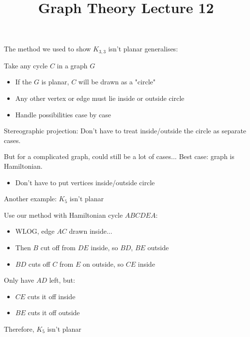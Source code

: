 \documentclass{beamer}
\title{Graph Theory Lecture 12}
\begin{document}
\begin{frame}{The method we used to show $K_{3,3}$ isn't planar generalises:}

\begin{block}{Take any cycle $C$ in a graph $G$}
\begin{itemize}
    \item If the $G$ is planar, $C$ will be drawn as a "circle"
    \item Any other vertex or edge must lie inside or outside circle
    \item Handle possibilities case by case
\end{itemize}
\end{block}

\begin{block}{Stereographic projection:}
Don't have to treat inside/outside the circle as separate cases.
\end{block}


\begin{block}{But for a complicated graph, could still be a lot of cases...}
  Best case: graph is Hamiltonian.
  \begin{itemize}
\item Don't have to put vertices inside/outside circle
  \end{itemize}
\end{block}

\end{frame}
\begin{frame}{Another example: $K_5$ isn't planar}
    \begin{block}{Use our method with Hamiltonian cycle $ABCDEA$:}
\begin{itemize}

    \item WLOG, edge $AC$ drawn inside...
    \item Then $B$ cut off from $DE$ inside, so $BD$, $BE$ outside
    \item $BD$ cuts off $C$ from $E$ on outside, so $CE$ inside
\end{itemize}
\end{block}
\begin{block}{Only have $AD$ left, but:}
\begin{itemize}
    \item $CE$ cuts it off inside
    \item $BE$ cuts it off outside
\end{itemize}
\end{block}
\begin{block}{Therefore, $K_5$ isn't planar}

\end{block}
\end{frame}
\end{document}
